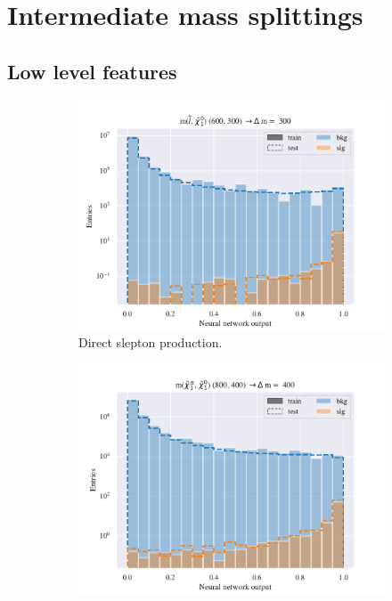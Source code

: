 \section{Intermediate mass splittings}

\subsection{Low level features}

\begin{figure}[H]
    \centering
    \begin{subfigure}[t!]{0.49\textwidth}
        \includegraphics[width = \textwidth]{Figures/SlepSlep/ML/NN/Low_level/Inter/scaled_train_test_396014.pdf}
        \caption{Direct slepton production.}
        \label{fig:}
    \end{subfigure}
    \begin{subfigure}[t!]{0.49\textwidth}
        \includegraphics[width = \textwidth]{Figures/SlepSnu/NN/Low_level/Inter/scaled_train_test_397150.pdf}

\end{subfigure}
\end{figure}
